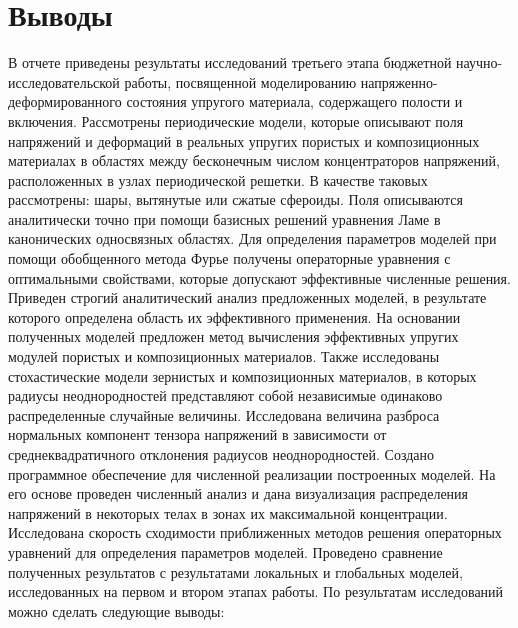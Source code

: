 

\setcounter{secnumdepth}{-1}
\chapter{Выводы}
\setcounter{secnumdepth}{2}

В отчете приведены результаты исследований третьего этапа бюджетной науч\-но-ис\-сле\-до\-ва\-тель\-ской работы, посвященной моделированию на\-пря\-же\-н\-но-де\-фор\-ми\-ро\-ва\-н\-но\-го состояния упругого материала, содержащего полости и включения. Рассмотрены периодические модели, которые описывают поля напряжений и деформаций в реальных упругих пористых и композиционных материалах в областях между бесконечным числом  концентраторов напряжений, расположенных в узлах периодической решетки. В качестве таковых рассмотрены:  шары, вытянутые или сжатые сфероиды. Поля описываются аналитически точно при помощи базисных решений уравнения Ламе в канонических односвязных областях. Для определения параметров моделей при помощи обобщенного метода Фурье получены операторные уравнения с оптимальными свойствами, которые допускают эффективные численные решения. Приведен строгий аналитический анализ предложенных моделей, в результате которого определена область их эффективного применения. На основании полученных моделей предложен метод вычисления эффективных упругих модулей пористых и композиционных материалов.
Также исследованы стохастические модели зернистых и композиционных материалов, в которых радиусы неоднородностей представляют собой  независимые одинаково распределенные случайные величины. Исследована величина разброса нормальных компонент тензора напряжений в зависимости от среднеквадратичного отклонения радиусов неоднородностей.
Создано программное обеспечение для численной реализации построенных моделей. На его основе проведен численный анализ и дана визуализация распределения напряжений в некоторых телах в зонах их максимальной концентрации. Исследована скорость сходимости приближенных методов решения операторных уравнений для определения параметров моделей. Проведено сравнение полученных результатов с результатами локальных и глобальных моделей, исследованных на первом и втором этапах работы. По результатам исследований можно сделать следующие выводы:

